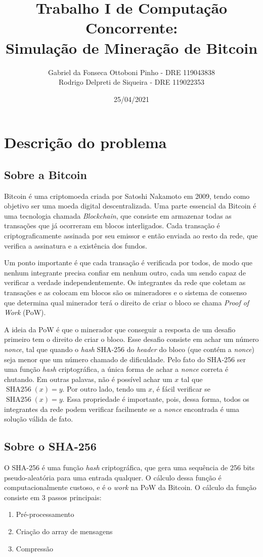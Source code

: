 \documentclass[12pt]{article}
\author{Gabriel da Fonseca Ottoboni Pinho - DRE 119043838\\
Rodrigo Delpreti de Siqueira - DRE 119022353}
\title{Trabalho I de Computação Concorrente: \\Simulação de Mineração de Bitcoin}
\date{25/04/2021}
\DeclareMathOperator{\sha}{SHA256}
\begin{document}
\maketitle
\newpage
\tableofcontents
\newpage

\section{Descrição do problema}
\subsection{Sobre a Bitcoin}
Bitcoin é uma criptomoeda criada por Satoshi Nakamoto em 2009,
tendo como objetivo ser uma moeda digital descentralizada.
Uma parte essencial da Bitcoin é uma tecnologia chamada \textit{Blockchain},
que consiste em armazenar todas as transações que já ocorreram
em blocos interligados.
Cada transação é criptograficamente assinada por seu emissor
e então enviada ao resto da rede,
que verifica a assinatura e a existência dos fundos.

Um ponto importante é que cada transação é verificada por todos,
de modo que nenhum integrante precisa confiar em nenhum outro,
cada um sendo capaz de verificar a verdade independentemente.
Os integrantes da rede que coletam as transações
e as colocam em blocos são os mineradores
e o sistema de consenso que determina qual minerador
terá o direito de criar o bloco se chama \textit{Proof of Work} (PoW).

A ideia da PoW é que o minerador que conseguir
a resposta de um desafio primeiro
tem o direito de criar o bloco.
Esse desafio consiste em achar um número \textit{nonce},
tal que quando o \textit{hash} SHA-256 do \textit{header} do bloco
(que contém a \textit{nonce})
seja menor que um número chamado de dificuldade.
Pelo fato do SHA-256 ser uma função \textit{hash} criptográfica,
a única forma de achar a \textit{nonce} correta é chutando.
Em outras palavas, não é possível achar um
$x$ tal que $\sha(x) = y$.
Por outro lado, tendo um $x$,
é fácil verificar se $\sha(x) = y$.
Essa propriedade é importante,
pois, dessa forma, todos os integrantes da rede podem
verificar facilmente se a \textit{nonce} encontrada
é uma solução válida de fato.

\subsection{Sobre o SHA-256}
O SHA-256 é uma função \textit{hash} criptográfica,
que gera uma sequência de 256 bits pseudo-aleatória
para uma entrada qualquer.
O cálculo dessa função é computacionalmente custoso,
e é o \textit{work} na PoW da Bitcoin.
O cálculo da função consiste em 3 passos principais:
\begin{enumerate}
	\item Pré-processamento
	\item Criação do array de mensagens
	\item Compressão
\end{enumerate}
\end{document}
